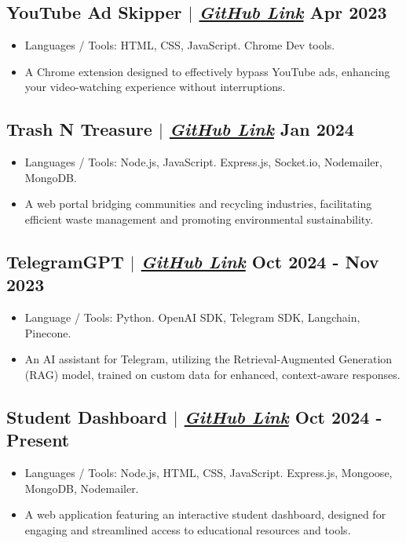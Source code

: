 \documentclass[11pt]{article}
\begin{document}
{{{\subsection{YouTube Ad Skipper {\normalfont $|$ \href{https://github.com/adarshkumar714/YT-Ad-Skipper}{\textit{GitHub Link}}} \hfill Apr 2023}
\begin{itemize}
    \item Languages / Tools: HTML, CSS, JavaScript. Chrome Dev tools.
    \item A Chrome extension designed to effectively bypass YouTube ads, enhancing your video-watching experience without interruptions.
\end{itemize}

\subsection{Trash N Treasure {\normalfont $|$ \href{https://github.com/adarshkumar714/YT-Ad-Skipper}{\textit{GitHub Link}}} \hfill Jan 2024}
\begin{itemize}
    \item Languages / Tools: Node.js, JavaScript. Express.js, Socket.io, Nodemailer, MongoDB.
    \item A web portal bridging communities and recycling industries, facilitating efficient waste management and promoting environmental sustainability.
\end{itemize}

\subsection{TelegramGPT {\normalfont $|$ \href{https://github.com/adarshkumar714/TelegramGPT}{\textit{GitHub Link}}} \hfill Oct 2024 - Nov 2023}
\begin{itemize}
    \item Language / Tools: Python. OpenAI SDK, Telegram SDK, Langchain, Pinecone.
    \item An AI assistant for Telegram, utilizing the Retrieval-Augmented Generation (RAG) model, trained on custom data for enhanced, context-aware responses.
\end{itemize}

\subsection{Student Dashboard {\normalfont $|$ \href{https://github.com/adarshkumar714/Student-Dashboard}{\textit{GitHub Link}}} \hfill Oct 2024 - Present}
\begin{itemize}
    \item Languages / Tools: Node.js, HTML, CSS, JavaScript. Express.js, Mongoose, MongoDB, Nodemailer.
    \item A web application featuring an interactive student dashboard, designed for engaging and streamlined access to educational resources and tools.
\end{itemize}


}}}
\end{document}
